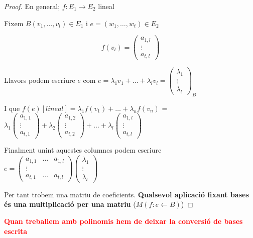 \documentclass[12pt]{article}
\begin{document}
\begin{proof}
    En general; $f: E_1 \rightarrow E_2$ lineal

Fixem $B(v_1, \dots, v_l)\in E_1$ i $e = (w_1,\dots, w_t) \in E_2$

\[f(v_l) = \begin{pmatrix}
    a_{1,l}\\
    \vdots\\
    a_{t,l}
\end{pmatrix}\]

Llavors podem escriure $e$ com $e = \lambda_1v_1 +\dots+ \lambda_lv_l = \begin{pmatrix}
    \lambda_1\\
    \vdots\\
    \lambda_l
\end{pmatrix}_B$ 

I que $f(e)[lineal] = \lambda_1f(v_1) + \dots + \lambda_nf(v_n)$ = $\lambda_1 \begin{pmatrix}
    a_{1,1}\\
    \vdots \\
    a_{t,1}
\end{pmatrix} + \lambda_2\begin{pmatrix}
    a_{1,2}\\
    \vdots \\
    a_{t,2}
\end{pmatrix}+\dots+\lambda_l \begin{pmatrix}
    a_{1,l}\\
    \vdots \\
    a_{t,l}
\end{pmatrix}$

Finalment unint aquestes columnes podem escriure $e = \begin{pmatrix}
    a_{1,1} & \dots & a_{1,l}\\
    \vdots\\
    a_{t,1} & \dots & a_{t,l}
\end{pmatrix}\begin{pmatrix}
    \lambda_1\\
    \vdots\\
    \lambda_l
\end{pmatrix}$

Per tant trobem una matriu de coeficients. \textbf{Qualsevol aplicació fixant bases és una multiplicació per una matriu} ($M(f: e \leftarrow B)$)
\end{proof}

\textcolor{red}{\textbf{Quan treballem amb polinomis hem de deixar la conversió de bases escrita}}
\end{document}
